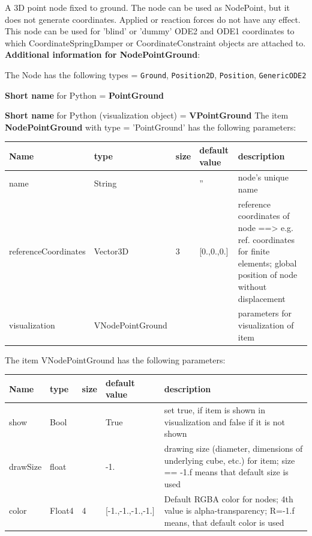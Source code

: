 \label{sec:item:NodePointGround}
A 3D point node fixed to ground. The node can be used as NodePoint, but it does not generate coordinates. Applied or reaction forces do not have any effect. This node can be used for 'blind' or 'dummy' ODE2 and ODE1 coordinates to which CoordinateSpringDamper or CoordinateConstraint objects are attached to.\vspace{12pt}
 \\{\bf Additional information for NodePointGround}:
\bi
  \item The Node has the following types = \texttt{Ground}, \texttt{Position2D}, \texttt{Position}, \texttt{GenericODE2}
  \item {\bf Short name} for Python = {\bf PointGround}  \item {\bf Short name} for Python (visualization object) = {\bf VPointGround}\ei
\vspace{12pt} \noindent The item {\bf NodePointGround} with type = 'PointGround' has the following parameters:\vspace{-1cm}\\ 
\begin{center}
  \footnotesize
  \begin{longtable}{| p{4.5cm} | p{2.5cm} | p{0.5cm} | p{2.5cm} | p{6cm} |}
    \hline
    \bf Name & \bf type & \bf size & \bf default value & \bf description \\ \hline
    name &     String &      &     '' &     node's unique name\\ \hline
    referenceCoordinates &     Vector3D &     3 &     [0.,0.,0.] &     reference coordinates of node ==> e.g. ref. coordinates for finite elements; global position of node without displacement\\ \hline
    visualization & VNodePointGround & & & parameters for visualization of item \\ \hline
	  \end{longtable}
	\end{center}
The item VNodePointGround has the following parameters:\vspace{-1cm}\\ 
\begin{center}
  \footnotesize
  \begin{longtable}{| p{4.5cm} | p{2.5cm} | p{0.5cm} | p{2.5cm} | p{6cm} |}
    \hline
    \bf Name & \bf type & \bf size & \bf default value & \bf description \\ \hline
    show &     Bool &      &     True &     set true, if item is shown in visualization and false if it is not shown\\ \hline
    drawSize &     float &      &     -1. &     drawing size (diameter, dimensions of underlying cube, etc.)  for item; size == -1.f means that default size is used\\ \hline
    color &     Float4 &     4 &     [-1.,-1.,-1.,-1.] &     Default RGBA color for nodes; 4th value is alpha-transparency; R=-1.f means, that default color is used\\ \hline
	  \end{longtable}
	\end{center}
